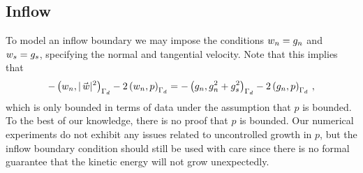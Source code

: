 \subsection{Inflow}\label{sec:continuous_inflow}
To model an inflow boundary we may impose the conditions $w_n = g_n$ and $w_s = g_s$, specifying the normal and tangential velocity. Note that this implies that
\begin{equation*}
  -\ipbcpart{\wcn}{|\wc|^2} - 2\ipbcpart{\wcn}{p} = -\ipbcpart{g_n}{g_n^2 + g_s^2} - 2\ipbcpart{g_n}{p} \,,
\end{equation*}
which is only bounded in terms of data under the assumption that $p$ is bounded. To the best of our knowledge, there is no proof that $p$ is bounded. Our numerical experiments do not exhibit any issues related to uncontrolled growth in $p$, but the inflow boundary condition should still be used with care since there is no formal guarantee that the kinetic energy will not grow unexpectedly.
